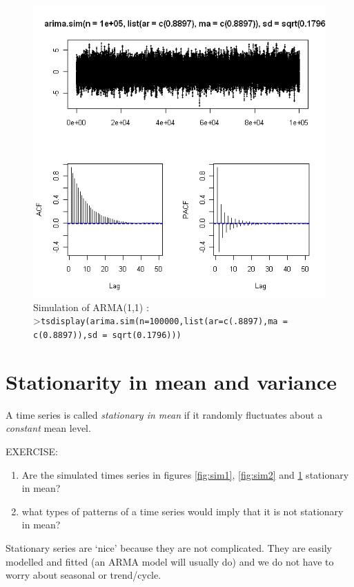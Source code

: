 \documentclass[a4paper,11pt,oneside,onecolumn]{book}
\begin{document}
\begin{figure}[!h]
\begin{center}
\includegraphics[width=.8\linewidth]{ SimAR1MA1.png}
\caption{Simulation of ARMA(1,1) : >\texttt{tsdisplay(arima.sim(n=100000,list(ar=c(.8897),ma = c(0.8897)),sd = sqrt(0.1796)))
}}
\label{fig:sim3}
\end{center}
\end{figure}


\section{Stationarity in mean and variance}

\begin{definition}
A time series is called {\it stationary in mean} if it randomly
fluctuates about a {\it constant} mean level. 
\end{definition}


\noindent EXERCISE: 
\begin{enumerate}
\item Are the simulated times series in figures \ref{fig:sim1}, \ref{fig:sim2} and \ref{fig:sim3}  stationary in mean?
\item what types of patterns of a time series would
imply  that it is not stationary in mean?
\end{enumerate}

Stationary series are `nice' because they are not complicated.
They are easily modelled and fitted (an ARMA model will
usually do) and we do not have to worry about seasonal or
trend/cycle.
\end{document}
